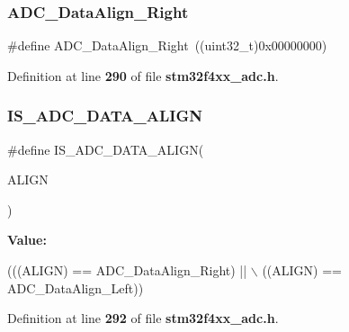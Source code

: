 \subsubsection{A\+D\+C\+\_\+\+Data\+Align\+\_\+\+Right}
{\footnotesize\ttfamily \#define A\+D\+C\+\_\+\+Data\+Align\+\_\+\+Right~((uint32\+\_\+t)0x00000000)}



Definition at line \textbf{ 290} of file \textbf{ stm32f4xx\+\_\+adc.\+h}.

\mbox{\label{group__ADC__data__align_ga2903b620e3c61dc47ed8c0fbf4197801}} 
\subsubsection{I\+S\+\_\+\+A\+D\+C\+\_\+\+D\+A\+T\+A\+\_\+\+A\+L\+I\+GN}
{\footnotesize\ttfamily \#define I\+S\+\_\+\+A\+D\+C\+\_\+\+D\+A\+T\+A\+\_\+\+A\+L\+I\+GN(\begin{DoxyParamCaption}\item[{}]{A\+L\+I\+GN }\end{DoxyParamCaption})}

{\bfseries Value\+:}
\begin{DoxyCode}
(((ALIGN) == ADC_DataAlign_Right) || \(\backslash\)
                                  ((ALIGN) == ADC_DataAlign_Left))
\end{DoxyCode}


Definition at line \textbf{ 292} of file \textbf{ stm32f4xx\+\_\+adc.\+h}.

